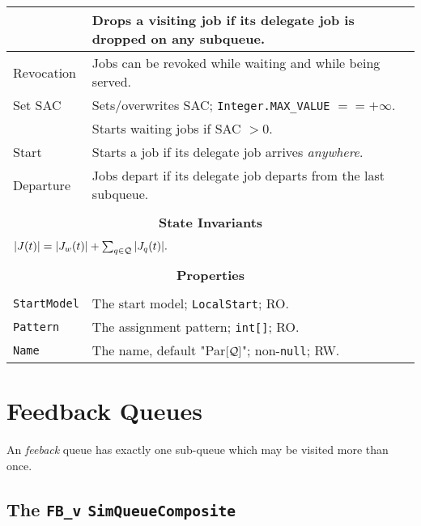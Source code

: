 \begin{tabular}{|l|l|}
	& Drops a visiting job if its delegate job is dropped on any subqueue. \\
	\hline
	Revocation & Jobs can be revoked while waiting and while being served. \\
	\hline
	Set SAC & Sets/overwrites SAC; \lstinline|Integer.MAX_VALUE| $== +\infty$. \\
	& Starts waiting jobs if SAC $> 0$. \\
	\hline
	Start & Starts a job if its delegate job arrives {\em anywhere}. \\
	\hline
	Departure & Jobs depart if its delegate job departs from the last subqueue. \\
	\hline
	\multicolumn{2}{|c|}{} \\
	\multicolumn{2}{|c|}{\bf State  Invariants} \\
	\multicolumn{2}{|c|}{} \\
	\hline
	\multicolumn{2}{|l|}{$|J(t)| = |J_{w}(t)| + \sum_{q \in \cal{Q}} |J_{q}(t)|.$} \\
	\hline
	\multicolumn{2}{|c|}{} \\
	\multicolumn{2}{|c|}{\bf Properties} \\
	\multicolumn{2}{|c|}{} \\
	\hline
	\lstinline|StartModel| & The start model; \lstinline|LocalStart|; RO. \\
	\hline
	\lstinline|Pattern|    & The assignment pattern; \lstinline|int[]|; RO. \\
	\hline
	\lstinline|Name|       & The name, default "Par$[\cal{Q}]$"; non-\lstinline|null|; RW. \\
	\hline
\end{tabular}

\section{Feedback Queues}

An {\em feeback\/} queue has exactly one sub-queue which may be visited more than once.

\subsection{The \lstinline{FB_v} \lstinline{SimQueueComposite}}
\label{sec:FB_v}

